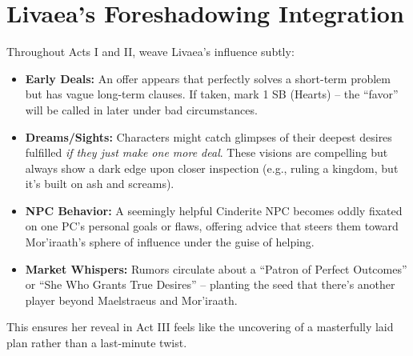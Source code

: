 \documentclass[11pt,letterpaper]{article}
\begin{document}
\section{Livaea's Foreshadowing Integration}

Throughout Acts I and II, weave Livaea's influence subtly:
\begin{itemize}[leftmargin=*]
    \item \textbf{Early Deals:} An offer appears that perfectly solves a short-term problem but has vague long-term clauses. If taken, mark 1 SB (Hearts) -- the ``favor'' will be called in later under bad circumstances.
    \item \textbf{Dreams/Sights:} Characters might catch glimpses of their deepest desires fulfilled \textit{if they just make one more deal}. These visions are compelling but always show a dark edge upon closer inspection (e.g., ruling a kingdom, but it's built on ash and screams).
    \item \textbf{NPC Behavior:} A seemingly helpful Cinderite NPC becomes oddly fixated on one PC's personal goals or flaws, offering advice that steers them toward Mor'iraath's sphere of influence under the guise of helping.
    \item \textbf{Market Whispers:} Rumors circulate about a ``Patron of Perfect Outcomes'' or ``She Who Grants True Desires'' -- planting the seed that there's another player beyond Maelstraeus and Mor'iraath.
\end{itemize}
This ensures her reveal in Act III feels like the uncovering of a masterfully laid plan rather than a last-minute twist.
\end{document}
